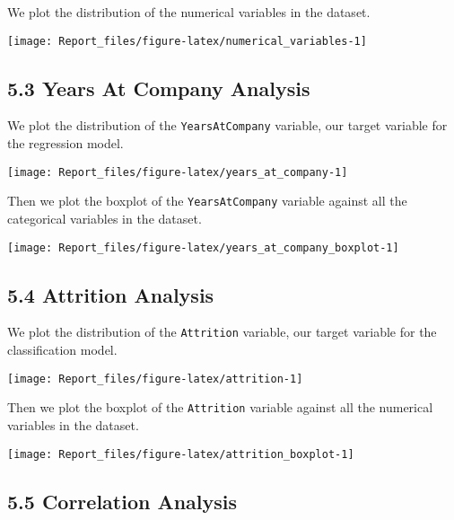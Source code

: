 \documentclass[
]{article}
\begin{document}
We plot the distribution of the numerical variables in the dataset.

\begin{center}\texttt{[image: Report\_files/figure-latex/numerical\_variables-1]} \end{center}

\hypertarget{years-at-company-analysis}{%
\subsection{5.3 Years At Company
Analysis}\label{years-at-company-analysis}}

We plot the distribution of the \texttt{YearsAtCompany} variable, our
target variable for the regression model.

\begin{center}\texttt{[image: Report\_files/figure-latex/years\_at\_company-1]} \end{center}

Then we plot the boxplot of the \texttt{YearsAtCompany} variable against
all the categorical variables in the dataset.

\begin{center}\texttt{[image: Report\_files/figure-latex/years\_at\_company\_boxplot-1]} \end{center}

\hypertarget{attrition-analysis}{%
\subsection{5.4 Attrition Analysis}\label{attrition-analysis}}

We plot the distribution of the \texttt{Attrition} variable, our target
variable for the classification model.

\begin{center}\texttt{[image: Report\_files/figure-latex/attrition-1]} \end{center}

Then we plot the boxplot of the \texttt{Attrition} variable against all
the numerical variables in the dataset.

\begin{center}\texttt{[image: Report\_files/figure-latex/attrition\_boxplot-1]} \end{center}

\hypertarget{correlation-analysis}{%
\subsection{5.5 Correlation Analysis}\label{correlation-analysis}}
\end{document}
